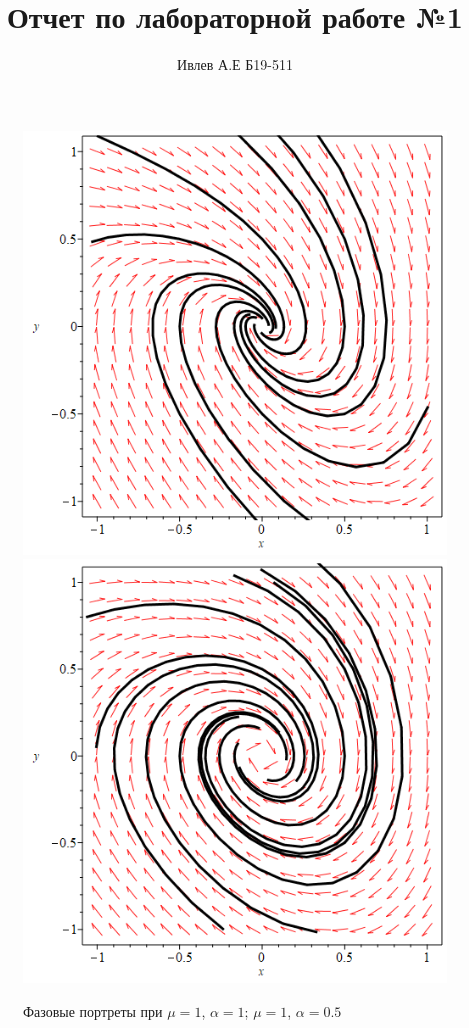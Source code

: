 \documentclass[10pt,a4paper]{article}
\title{Отчет по лабораторной работе №1}
\author{Ивлев А.Е Б19-511}
\begin{document}
	\maketitle
	
	\begin{figure}[h]
		\centering
		{\includegraphics[scale=0.3]{phase_portrait, mu=1, alpha=1}}
		{\includegraphics[scale=0.3]{phase_portrait, mu=1, alpha=0.5}}
		\caption{Фазовые портреты при $\mu = 1$, $\alpha = 1$; $\mu = 1$, $\alpha = 0.5$}
		\label{image/1}
	\end{figure}
\end{document}
